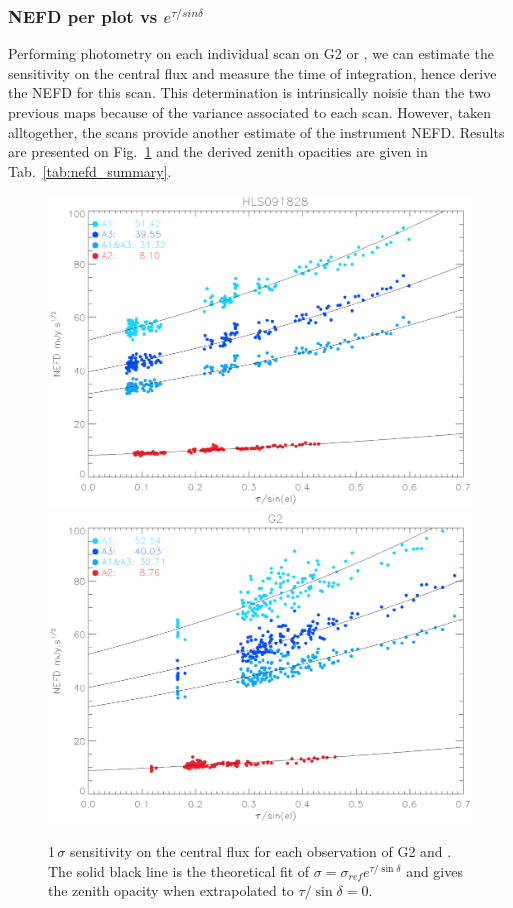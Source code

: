 \subsubsection{NEFD per plot vs $e^{\tau/sin\delta}$}

Performing photometry on each individual scan on G2 or \hls, we can estimate the
sensitivity on the central flux and measure the time of integration, hence
derive the NEFD for this scan. This determination is intrinsically noisie than
the two previous maps because of the variance associated to each scan. However,
taken alltogether, the scans provide another estimate of the instrument
NEFD. Results are presented on Fig.~\ref{fig:nefd_scatter} and the derived
zenith opacities are given in Tab.~\ref{tab:nefd_summary}.

\begin{figure}[hhh]
\begin{center}
\includegraphics[clip, angle=0, scale =0.42]{Figures/hls_NEFD_vs_TauElev_all.eps}
\includegraphics[clip, angle=0, scale =0.42]{Figures/g2_NEFD_vs_TauElev_all.eps}
\caption[NEFD per scan]{1\,$\sigma$ sensitivity on the central flux for each
  observation of G2 and \hls. The solid black line is the theoretical fit of
  $\sigma = \sigma_{ref}e^{\tau/\sin\delta}$ and gives the zenith opacity when
  extrapolated to $\tau/\sin\delta = 0$.}
\label{fig:nefd_scatter}
\end{center}
\end{figure}
